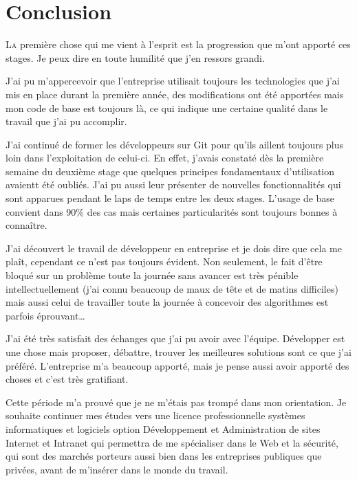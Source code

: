 \chapter{Conclusion} %
\label{cha:Conclusion}

\lettrine{L}{a} première chose qui me vient à l'esprit est la
progression que m'ont apporté ces stages. Je peux dire en toute
humilité que j'en ressors grandi.

J'ai pu m'appercevoir que l'entreprise utilisait toujours les
technologies que j'ai mis en place durant la première année, des
modifications ont été apportées mais mon code de base est toujours là,
ce qui indique une certaine qualité dans le travail que j'ai pu
accomplir.

J'ai continué de former les développeurs sur Git pour qu'ils aillent
toujours plus loin dans l'exploitation de celui-ci. En effet, j'avais
constaté dès la première semaine du deuxième stage que quelques
principes fondamentaux d'utilisation avaientt été oubliés. J'ai pu aussi
leur présenter de nouvelles fonctionnalités qui sont apparues pendant le
laps de temps entre les deux stages. L'usage de base convient dans
90\%{} des cas mais certaines particularités sont toujours bonnes à
connaître.

J'ai découvert le travail de développeur en entreprise et je dois dire
que cela me plaît, cependant ce n'est pas toujours évident. Non
seulement, le fait d'être bloqué sur un problème toute la journée sans
avancer est très pénible intellectuellement (j'ai connu beaucoup de maux
de tête et de matins difficiles) mais aussi celui de travailler toute la
journée à concevoir des algorithmes est parfois éprouvant\dots

J'ai été très satisfait des échanges que j'ai pu avoir avec l'équipe.
Développer est une chose mais proposer, débattre, trouver les meilleures
solutions sont ce que j'ai préféré. L'entreprise m'a beaucoup apporté,
mais je pense aussi avoir apporté des choses et c'est très gratifiant.

Cette période m'a prouvé que je ne m'étais pas trompé dans mon
orientation. Je souhaite continuer mes études vers une licence
professionnelle systèmes informatiques et logiciels option \og
Développement et Administration de sites Internet et Intranet \fg{} qui
permettra de me spécialiser dans le Web et la sécurité, qui sont des
marchés porteurs aussi bien dans les entreprises publiques que privées,
avant de m'insérer dans le monde du travail.
